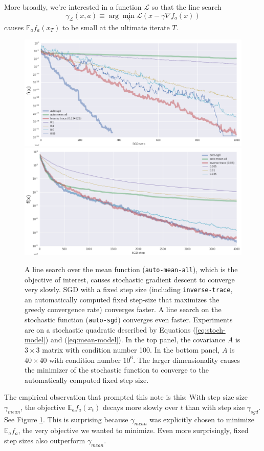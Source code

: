 \documentclass{article}
\newcommand{\E}{\mathbb{E}}
\renewcommand{\L}{\mathcal{L}}
\begin{document}
More broadly, we're interested in a function $\L$ so that the line search
$$\gamma_\L(x,a) \equiv \arg\min_\gamma \L(x-\gamma \nabla f_a(x))$$
causes $\E_a f_a(x_T)$ to be small at the ultimate iterate $T$.

\begin{figure}
    \centering
    \includegraphics[width=12cm]{cond=20-dim=3}
    \includegraphics[width=12cm]{cond=1e6-dim=40}
    \caption{A line search over the mean function ({\tt auto-mean-all}), which is the objective of interest, causes stochastic gradient descent to converge very slowly. SGD with a fixed step size (including {\tt inverse-trace}, an automatically computed fixed step-size that maximizes the greedy convergence rate) converges faster. A line search on the stochastic function ({\tt auto-sgd}) converges even faster. Experiments are on a stochastic quadratic described by Equations (\ref{eq:stoch-model}) and (\ref{eq:mean-model}). In the top panel, the covariance $A$ is $3\times 3$ matrix with condition number 100. In the bottom panel, $A$ is $40\times 40$ with condition number $10^6$. The larger dimensionality causes the minimizer of the stochastic function to converge to the automatically computed fixed step size.}
    \label{fig:emp}
\end{figure}

The empirical observation that prompted this note is this: With step size size $\gamma_{mean}$, the objective $\E_a f_a(x_t)$ decays more slowly over $t$ than with step size $\gamma_{sgd}$. See Figure \ref{fig:emp}. This is surprising because $\gamma_{mean}$ was explicitly chosen to minimize $\E_a f_a$, the very objective we wanted to minimize. Even more surprisingly, fixed step sizes also outperform $\gamma_{mean}$.
\end{document}
